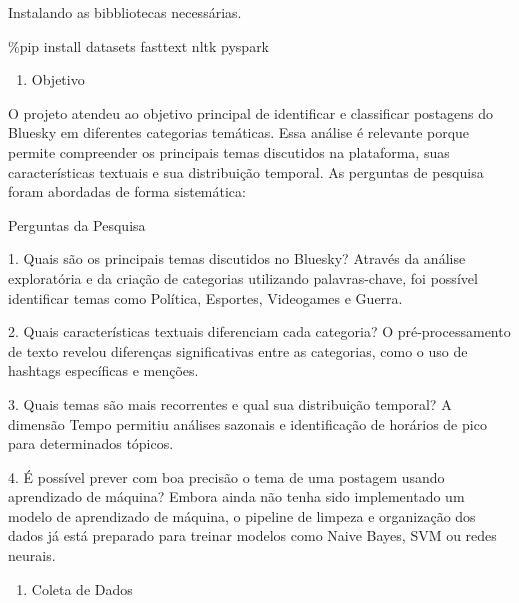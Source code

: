 \documentclass[
  letterpaper,
  DIV=11,
  numbers=noendperiod]{scrartcl}
\author{Mateus Sales Bentes}
\date{31-03-1997}
\newenvironment{Shaded}{\begin{snugshade}}{\end{snugshade}}
\newcommand{\NormalTok}[1]{\textcolor[rgb]{0.00,0.23,0.31}{#1}}
\newcommand{\OperatorTok}[1]{\textcolor[rgb]{0.37,0.37,0.37}{#1}}
\providecommand{\tightlist}{%
  \setlength{\itemsep}{0pt}\setlength{\parskip}{0pt}}\usepackage{longtable,booktabs,array}
\begin{document}
Instalando as bibbliotecas necessárias.

\begin{Shaded}
\begin{Highlighting}[]
\OperatorTok{\%}\NormalTok{pip install datasets fasttext nltk pyspark}
\end{Highlighting}
\end{Shaded}

\begin{enumerate}
\def\labelenumi{\arabic{enumi}.}
\tightlist
\item
  Objetivo 
\end{enumerate}

O projeto atendeu ao objetivo principal de identificar e classificar
postagens do Bluesky em diferentes categorias temáticas. Essa análise é
relevante porque permite compreender os principais temas discutidos na
plataforma, suas características textuais e sua distribuição temporal.
As perguntas de pesquisa foram abordadas de forma sistemática:

Perguntas da Pesquisa

\begin{VerbatimWithBreaks}
1. Quais são os principais temas discutidos no Bluesky?
    Através da análise exploratória e da criação de categorias utilizando palavras-chave, foi possível identificar temas como Política, Esportes, Videogames e Guerra.

2. Quais características textuais diferenciam cada categoria?
     O pré-processamento de texto revelou diferenças significativas entre as categorias, como o uso de hashtags específicas e menções.

3. Quais temas são mais recorrentes e qual sua distribuição temporal?
    A dimensão Tempo permitiu análises sazonais e identificação de horários de pico para determinados tópicos.

4. É possível prever com boa precisão o tema de uma postagem usando aprendizado de máquina?
    Embora ainda não tenha sido implementado um modelo de aprendizado de máquina, o pipeline de limpeza e organização dos dados já está preparado para treinar modelos como Naive Bayes, SVM ou redes neurais.
\end{VerbatimWithBreaks}

\begin{enumerate}
\def\labelenumi{\arabic{enumi}.}
\setcounter{enumi}{1}
\tightlist
\item
  Coleta de Dados 
\end{enumerate}
\end{document}
